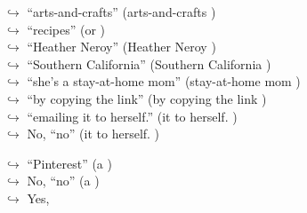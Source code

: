 \documentclass[11pt,a4paper, onecolumn]{article}
\begin{document}
\begin{figure}[t] \small \begin{tcolorbox}[boxsep=0pt,left=5pt,right=0pt,top=2pt,colback = yellow!5] \begin{dialogue}
 \small 
\colorbox{pink!25}{$\hookrightarrow$}
{ ``arts-and-crafts'' (arts-and-crafts ) }
\\
\colorbox{pink!25}{$\hookrightarrow$}
{ ``recipes'' (or ) }
\\
\colorbox{pink!25}{$\hookrightarrow$}
{ ``Heather Neroy'' (Heather Neroy ) }
\\
\colorbox{pink!25}{$\hookrightarrow$}
{ ``Southern California'' (Southern California ) }
\\
\colorbox{pink!25}{$\hookrightarrow$}
{ ``she's a stay-at-home mom'' (stay-at-home mom ) }
\\
\colorbox{pink!25}{$\hookrightarrow$}
{ ``by copying the link'' (by copying the link ) }
\\
\colorbox{pink!25}{$\hookrightarrow$}
{ ``emailing it to herself.'' (it to herself. ) }
\\
\colorbox{pink!25}{$\hookrightarrow$}
\colorbox{red!25}{No,}
{ ``no'' (it to herself. ) }
 \end{dialogue}\end{tcolorbox}\end{figure}\begin{figure}[t] \small \begin{tcolorbox}[boxsep=0pt,left=5pt,right=0pt,top=2pt,colback = yellow!5] \begin{dialogue}
 \small 
\colorbox{pink!25}{$\hookrightarrow$}
{ ``Pinterest'' (a ) }
\\
\colorbox{pink!25}{$\hookrightarrow$}
\colorbox{red!25}{No,}
{ ``no'' (a ) }
\\
\colorbox{pink!25}{$\hookrightarrow$}
\colorbox{red!25}{Yes,}

\end{dialogue}
\end{tcolorbox}
\end{figure}
\end{document}
